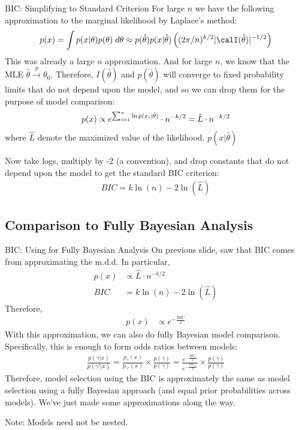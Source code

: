 \documentclass[aspectratio=169, handout]{beamer}
\newcommand{\pto}{\xrightarrow{p}}
\newcommand{\sumin}{\sum^n_{i=1}}
\begin{document}
{\footnotesize
\begin{frame}{BIC: Simplifying to Standard Criterion}
For large $n$ we have the following approximation to the marginal
likelihood by Laplace's method:
\begin{align*}
  p(x)
  =
  \int
  p(x|\theta)
  p(\theta)\;d\theta
  \approx
  p(\hat{\theta})
  p(x|\hat{\theta})
  \left(
  (2\pi/n)^{k/2} |\calI(\hat{\theta})|^{-1/2}
  \right)
\end{align*}
This was already a large $n$ approximation. And for large $n$, we know
that the MLE $\hat{\theta}\pto \theta_0$.
Therefore, $I(\hat{\theta})$ and $p(\hat{\theta})$ will converge to
fixed probability limits that do not depend upon the model, and so we
can drop them for the purpose of model comparison:
\begin{align*}
  p(x)
  \propto
  e^{%
    \sumin \ln p(x_i|\hat{\theta})
  }
  \cdot
  n^{-k/2}
  =
  \hat{L}
  \cdot
  n^{-k/2}
\end{align*}
where $\hat{L}$ denote the maximized value of the likelihood.
$p(x|\hat{\theta})$

Now take logs, multiply by -2 (a convention), and drop constants that do
not depend upon the model to get the standard BIC criterion:
\begin{align*}
  BIC
  =
  k
  \ln(n)
  -
  2\ln(\hat{L})
\end{align*}
\end{frame}
}


\subsection{Comparison to Fully Bayesian Analysis}

{\footnotesize
\begin{frame}{BIC: Using for Fully Bayesian Analysis}
On previous slide, saw that BIC comes from approximating the m.d.d.
In particular,
\begin{align*}
  p(x)
  &\propto
  \hat{L}
  \cdot
  n^{-k/2}
  \\
  BIC
  &=
  k
  \ln(n)
  -
  2\ln(\hat{L})
\end{align*}
Therefore,
\begin{align*}
  p(x)
  &\propto
  e^{-\frac{BIC}{2}}
\end{align*}
With this approximation, we can also do
\alert{fully Bayesian model comparison}.
Specifically, this is enough to form odds ratios between models:
\begin{align*}
  \frac{p(\gamma|x)}{p(\gamma'|x)}
  =
  \frac{p_\gamma(x)}{p_{\gamma'}(x)}
  \times
  \frac{p(\gamma)}{p(\gamma)}
  =
  \frac{e^{-\frac{BIC_\gamma}{2}}}{e^{-\frac{BIC_{\gamma'}}{2}}}
  \times
  \frac{p(\gamma)}{p(\gamma)}
\end{align*}
Therefore, model selection using the BIC is approximately the same as
model selection using a fully Bayesian approach (and equal prior
probabilities across models).
We've just made some approximations along the way.

Note:
Models \alert{need not} be nested.
\end{frame}
}
\end{document}
